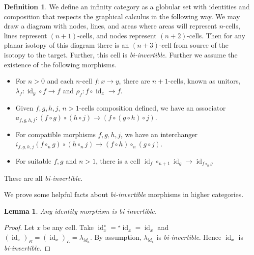 \documentclass{article}
\newtheorem{lemma}{Lemma}
\theoremstyle{definition}
\newtheorem{definition}{Definition}
\theoremstyle{examplestyle}
\DeclareMathOperator{\id}{id}
\newcommand{\linv}[1]{{}^\star\!#1}
\newcommand{\rinv}[1]{#1^\star}
\begin{document}
\begin{definition}
  \label{def:higher-cat}
  We define an infinity category as a globular set with identities and composition that respects the graphical calculus in the following way. We may draw a diagram with nodes, lines, and areas where areas will represent \(n\)-cells, lines represent \((n+1)\)-cells, and nodes represent \((n+2)\)-cells. Then for any planar isotopy of this diagram there is an \((n+3)\)-cell from source of the isotopy to the target. Further, this cell is \emph{bi-invertible}. Further we assume the existence of the following morphisms.
  \begin{itemize}
  \item For \(n>0\) and each \(n\)-cell \(f: x \to y\), there are \(n+1\)-cells, known as unitors, \(\lambda_f: \id_y \circ f \to f\) and \(\rho_f: f \circ \id_x \to f\).
  \item Given \(f,g,h,j\), \(n>1\)-cells composition defined, we have an associator \(a_{f,g,h,j} : (f \circ g) \circ (h \circ j) \to (f \circ (g \circ h) \circ j)\).
  \item For compatible morphisms \(f,g,h,j\), we have an interchanger \(i_{f,g,h,j}(f \circ_n g) \circ (h \circ_n j) \to (f \circ h) \circ_n (g \circ j)\).
  \item For suitable \(f,g\) and \(n > 1\), there is a cell \(\id_f \circ_{n+1} \id_g \to \id_{f \circ_n g}\)
  \end{itemize}
  These are all \emph{bi-invertible}.
\end{definition}

We prove some helpful facts about \emph{bi-invertible} morphisms in higher categories.

\begin{lemma}
  \label{lem:identity}
  Any identity morphism is \emph{bi-invertible}.
\end{lemma}

\begin{proof}
  Let \(x\) be any cell. Take \(\rinv {\id_x} = \linv {\id_x} = \id_x\) and \((\id_x)_R = (\id_x)_L = \lambda_{id_x}\). By assumption, \(\lambda_{id_x}\) is \emph{bi-invertible}. Hence \(\id_x\) is \emph{bi-invertible}.
\end{proof}
\end{document}
